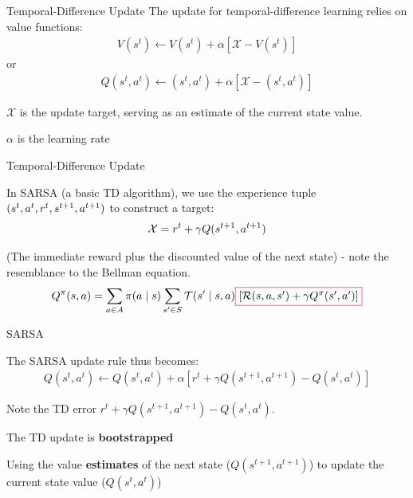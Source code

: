 \begin{frame}{Temporal-Difference Update}
    The update for temporal-difference learning relies on value functions:
    \vspace{0pt}
    \begin{align*}
        V(s^{t}) \gets V(s^{t}) + \alpha \left[\mathcal{X} - V(s^{t})\right]
    \end{align*}
    or 
    \vspace{0pt}
    \begin{align*}
        Q(s^{t}, a^{t}) \gets (s^{t}, a^{t})  + \alpha \left[\mathcal{X} - (s^{t}, a^{t})\right]
    \end{align*}
	\blist
    	\item $\mathcal{X}$ is the update target, serving as an estimate of the current state value. 
    	\item $\alpha$ is the learning rate
    \elist
\end{frame}

\begin{frame}{Temporal-Difference Update}
    
    In SARSA (a basic TD algorithm), we use the experience tuple $(s^{t}, a^{t}, r^{t}, s^{t+1}, a^{t+1})$ to construct a target:
    \begin{align*}
        \mathcal{X} = r^t + \gamma Q(s^{t+1}, a^{t+1})
    \end{align*}
    
    (The immediate reward plus the discounted value of the next state) - note the resemblance to the Bellman equation. 
    \vspace{10pt}
    \begin{align*}
        Q^{\pi}(\st, \ac) = \sum_{\ac \in \Ac} \pi(\ac \mid \st) \sum_{\st' \in \St} \Stf(\st' \mid \st, \ac) \Cboxed{red}{$\left[\Rew(\st, \ac, \st') + \gamma Q^{\pi}(s', a')\right]$}
    \end{align*}
\end{frame}

\begin{frame}{SARSA}
    
The SARSA update rule thus becomes:
\vspace{0pt}
\begin{align*}
  Q(s^t, a^t) \leftarrow Q(s^t, a^t) + \alpha[r^t + \gamma Q(s^{t+1}, a^{t+1})- Q(s^t,a^t)] 
\end{align*}

\blist
    \item Note the TD error $r^t + \gamma Q(s^{t+1}, a^{t+1})- Q(s^t,a^t)$.
    \item The TD update is \textbf{bootstrapped}
    \item Using the value \textbf{estimates} of the next state ($Q(s^{t+1}, a^{t+1})$) to update the current state value ($Q(s^t,a^t)$)
\elist



\end{frame}

